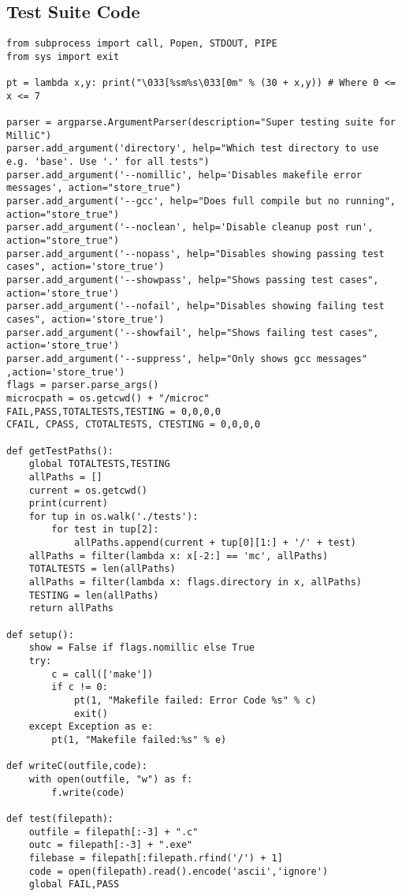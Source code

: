 \documentclass[a4paper]{article}
\begin{document}
\subsection{Test Suite Code}
\scriptsize
\begin{verbatim}
from subprocess import call, Popen, STDOUT, PIPE
from sys import exit

pt = lambda x,y: print("\033[%sm%s\033[0m" % (30 + x,y)) # Where 0 <= x <= 7

parser = argparse.ArgumentParser(description="Super testing suite for MilliC")
parser.add_argument('directory', help="Which test directory to use e.g. 'base'. Use '.' for all tests")
parser.add_argument('--nomillic', help='Disables makefile error messages', action="store_true")
parser.add_argument('--gcc', help="Does full compile but no running", action="store_true")
parser.add_argument('--noclean', help='Disable cleanup post run', action="store_true")
parser.add_argument('--nopass', help="Disables showing passing test cases", action='store_true')
parser.add_argument('--showpass', help="Shows passing test cases", action='store_true')
parser.add_argument('--nofail', help="Disables showing failing test cases", action='store_true')
parser.add_argument('--showfail', help="Shows failing test cases", action='store_true')
parser.add_argument('--suppress', help="Only shows gcc messages" ,action='store_true')
flags = parser.parse_args()
microcpath = os.getcwd() + "/microc"
FAIL,PASS,TOTALTESTS,TESTING = 0,0,0,0
CFAIL, CPASS, CTOTALTESTS, CTESTING = 0,0,0,0

def getTestPaths():
    global TOTALTESTS,TESTING
    allPaths = []
    current = os.getcwd()
    print(current)
    for tup in os.walk('./tests'):
        for test in tup[2]:
            allPaths.append(current + tup[0][1:] + '/' + test)
    allPaths = filter(lambda x: x[-2:] == 'mc', allPaths)
    TOTALTESTS = len(allPaths)
    allPaths = filter(lambda x: flags.directory in x, allPaths)
    TESTING = len(allPaths)
    return allPaths

def setup():
    show = False if flags.nomillic else True
    try:
        c = call(['make'])
        if c != 0:
            pt(1, "Makefile failed: Error Code %s" % c)
            exit()
    except Exception as e:
        pt(1, "Makefile failed:%s" % e)

def writeC(outfile,code):
    with open(outfile, "w") as f:
        f.write(code)

def test(filepath):
    outfile = filepath[:-3] + ".c"
    outc = filepath[:-3] + ".exe"
    filebase = filepath[:filepath.rfind('/') + 1]
    code = open(filepath).read().encode('ascii','ignore')
    global FAIL,PASS


\end{verbatim}
\end{document}
